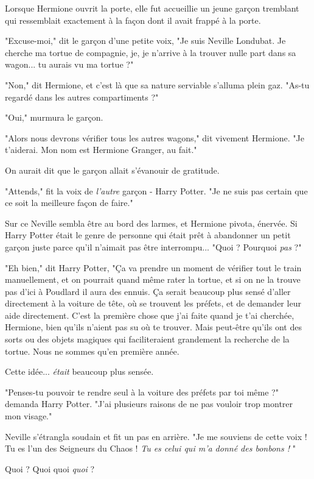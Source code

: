 Lorsque Hermione ouvrit la porte, elle fut accueillie un jeune garçon tremblant qui ressemblait exactement à la façon dont il avait frappé à la porte.

"Excuse-moi," dit le garçon d'une petite voix, "Je suis Neville Londubat. Je cherche ma tortue de compagnie, je, je n'arrive à la trouver nulle part dans sa wagon... tu aurais vu ma tortue ?"

"Non," dit Hermione, et c'est là que sa nature serviable s'alluma plein gaz. "As-tu regardé dans les autres compartiments ?"

"Oui," murmura le garçon.

"Alors nous devrons vérifier tous les autres wagons," dit vivement Hermione. "Je t'aiderai. Mon nom est Hermione Granger, au fait."

On aurait dit que le garçon allait s'évanouir de gratitude.

"Attends," fit la voix de \emph{l'autre}  garçon - Harry Potter. "Je ne suis pas certain que ce soit la meilleure façon de faire."

Sur ce Neville sembla être au bord des larmes, et Hermione pivota, énervée. Si Harry Potter était le genre de personne qui était prêt à abandonner un petit garçon juste parce qu'il n'aimait pas être interrompu... "Quoi ? Pourquoi \emph{pas}  ?"

"Eh bien," dit Harry Potter, "Ça va prendre un moment de vérifier tout le train manuellement, et on pourrait quand même rater la tortue, et si on ne la trouve pas d'ici à Poudlard il aura des ennuis. Ça serait beaucoup plus sensé d'aller directement à la voiture de tête, où se trouvent les préfets, et de demander leur aide directement. C'est la première chose que j'ai faite quand je t'ai cherchée, Hermione, bien qu'ils n'aient pas su où te trouver. Mais peut-être qu'ils ont des sorts ou des objets magiques qui faciliteraient grandement la recherche de la tortue. Nous ne sommes qu'en première année.

Cette idée... \emph{était}  beaucoup plus sensée.

"Penses-tu pouvoir te rendre seul à la voiture des préfets par toi même ?" demanda Harry Potter. "J'ai plusieurs raisons de ne pas vouloir trop montrer mon visage."

Neville s'étrangla soudain et fit un pas en arrière. "Je me souviens de cette voix ! Tu es l'un des Seigneurs du Chaos ! \emph{Tu es celui qui m'a donné des bonbons !} "

Quoi ? Quoi quoi \emph{quoi}  ?

